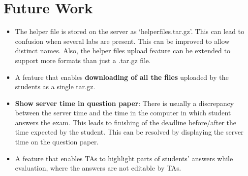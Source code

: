 \section{Future Work}

\begin{itemize}
\item The helper file is stored on the server as `helperfiles.tar.gz'. This can lead to confusion when several labs are present. This can be improved to allow distinct names. Also, the helper files upload feature can be extended to support more formats than just a .tar.gz file.

\item A feature that enables \textbf{downloading of all the files} uploaded by the students as a single tar.gz.

\item \textbf{Show server time in question paper}: There is usually a discrepancy between the server time and the time in the computer in which student answers the exam. This leads to finishing of the deadline before/after the time expected by the student. This can be resolved by displaying the server time on the question paper.

\item A feature that enables TAs to highlight parts of students' answers while evaluation, where the answers are not editable by TAs.
\end{itemize}